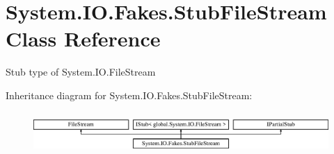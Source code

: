 \hypertarget{class_system_1_1_i_o_1_1_fakes_1_1_stub_file_stream}{\section{System.\-I\-O.\-Fakes.\-Stub\-File\-Stream Class Reference}
\label{class_system_1_1_i_o_1_1_fakes_1_1_stub_file_stream}
}


Stub type of System.\-I\-O.\-File\-Stream 


Inheritance diagram for System.\-I\-O.\-Fakes.\-Stub\-File\-Stream\-:\begin{figure}[H]
\begin{center}
\leavevmode
\includegraphics[height=1.616162cm]{class_system_1_1_i_o_1_1_fakes_1_1_stub_file_stream}
\end{center}
\end{figure}
